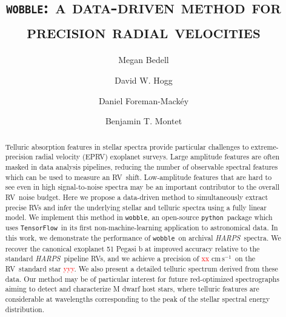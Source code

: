 \documentclass[twocolumn]{aastex62}
\newcommand{\unit}[1]{\mathrm{#1}}
\newcommand{\cm}{\unit{cm}}
\newcommand{\s}{\unit{s}}
\newcommand{\cms}{$\cm\,\s^{-1}$}
\newcommand{\todo}[1]{\textcolor{red}{#1}}  %
\newcommand{\acronym}[1]{{\small{#1}}}
\newcommand{\project}[1]{\textsl{#1}}
\newcommand{\code}[1]{\texttt{#1}}
\newcommand{\HARPS}{\project{\acronym{HARPS}}}
\newcommand{\RV}{\acronym{RV}}
\newcommand{\EPRV}{\acronym{EPRV}}
\newcommand{\wobble}{\code{wobble}}
\newcommand{\TF}{\code{TensorFlow}}
\newcommand{\python}{\code{python}}
\begin{document}
\graphicspath{ {../figures/} }

\title{\textsc{\wobble: a data-driven method for precision radial velocities}}

\author[0000-0001-9907-7742]{Megan Bedell}

\author[0000-0003-2866-9403]{David W. Hogg}

\author{Daniel Foreman-Mack\'{e}y}

\author{Benjamin T. Montet}


\begin{abstract}
Telluric absorption features in stellar spectra provide particular challenges to extreme-precision radial velocity (\EPRV) exoplanet surveys. 
Large amplitude features are often masked in data analysis pipelines, reducing the number of observable spectral features which can be used to measure an \RV\ shift.
Low-amplitude features that are hard to see even in high signal-to-noise spectra may be an important contributor to the overall \RV\ noise budget.
Here we propose a data-driven method to simultaneously extract precise \RV s and infer the underlying stellar and telluric spectra using a fully linear model. 
We implement this method in \wobble, an open-source \python\ package which uses \TF\ in its first non-machine-learning application to astronomical data. 
In this work, we demonstrate the performance of \wobble\ on archival \HARPS\ spectra.
We recover the canonical exoplanet 51 Pegasi b at improved accuracy relative to the standard \HARPS\ pipeline \RV s, and we achieve a precision of \todo{xx} \cms\ on the \RV\ standard star \todo{yyy}. 
We also present a detailed telluric spectrum derived from these data. 
Our method may be of particular interest for future red-optimized spectrographs aiming to detect and characterize M dwarf host stars, where telluric features are considerable at wavelengths corresponding to the peak of the stellar spectral energy distribution.  \end{abstract}
\end{document}
